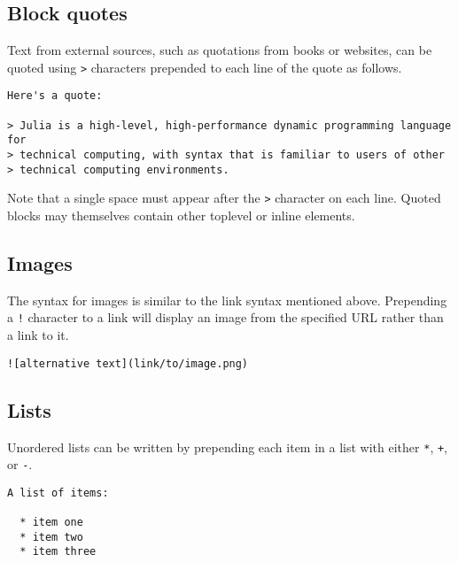 \subsection{Block quotes}



Text from external sources, such as quotations from books or websites, can be quoted using \texttt{>} characters prepended to each line of the quote as follows.




\begin{lstlisting}
Here's a quote:

> Julia is a high-level, high-performance dynamic programming language for
> technical computing, with syntax that is familiar to users of other
> technical computing environments.
\end{lstlisting}



Note that a single space must appear after the \texttt{>} character on each line. Quoted blocks may themselves contain other toplevel or inline elements.



\hypertarget{9122787766607047979}{}


\subsection{Images}



The syntax for images is similar to the link syntax mentioned above. Prepending a \texttt{!} character to a link will display an image from the specified URL rather than a link to it.




\begin{verbatim}
![alternative text](link/to/image.png)
\end{verbatim}



\hypertarget{5671077042730580546}{}


\subsection{Lists}



Unordered lists can be written by prepending each item in a list with either \texttt{*}, \texttt{+}, or \texttt{-}.




\begin{lstlisting}
A list of items:

  * item one
  * item two
  * item three
\end{lstlisting}



